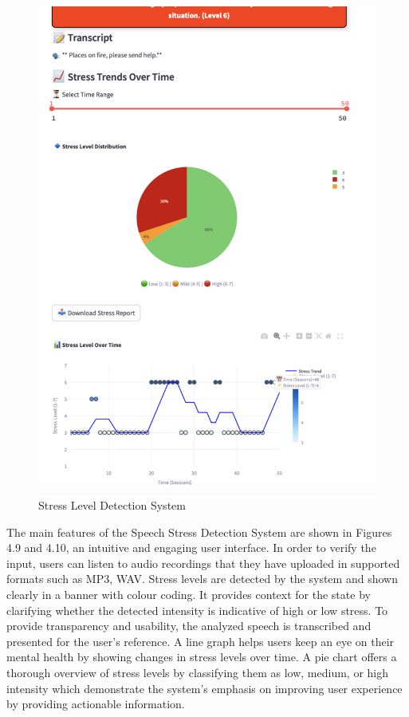 \documentclass[Arial,12pt,openright,twoside]{book}
\begin{document}
 \begin{figure}[p]
    \centering
    \includegraphics[width=0.9\columnwidth]{aoverall2.png}
    \caption{Stress Level Detection System}
    \label{fig:system_architecture}
\end{figure}
The main features of the Speech Stress Detection System are shown in Figures 4.9 and 4.10, an intuitive and engaging user interface. In order to verify the input, users can listen to audio recordings that they have uploaded in supported formats such as MP3, WAV. Stress levels are detected by the system and shown clearly in a banner with colour coding. It provides context for the state by clarifying whether the detected intensity is indicative of high or low stress. To provide transparency and usability, the analyzed speech is transcribed and presented for the user's reference. A line graph helps users keep an eye on their mental health by showing changes in stress levels over time. A pie chart offers a thorough overview of stress levels by classifying them as low, medium, or high intensity  which demonstrate the system's emphasis on improving user experience by providing actionable information.
\end{document}
